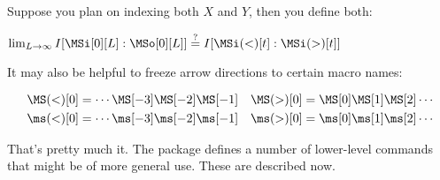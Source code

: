 \documentclass{article}
\begin{document}
Suppose you plan on indexing both $X$ and $Y$, then you define both:
\begin{LTXexample}[pos=b]
$\lim_{L \to \infty} I[ \MSi[0][L] : \MSo[0][L] ] \stackrel{?}{=} I[ \MSi(<)[t] : \MSi(>)[t]]$
\end{LTXexample}

It may also be helpful to freeze arrow directions to certain macro names:
\begin{LTXexample}[pos=b]
\newcommand{\Past}{\MS(<)}
\newcommand{\past}{\ms(<)}
\newcommand{\Future}{\MS(>)}
\newcommand{\future}{\ms(>)}
\begin{align*}
\Past[0] &= \cdots \MS[-3] \MS[-2] \MS[-1] &
\Future[0] &= \MS[0] \MS[1] \MS[2] \cdots \\
\past[0] &= \cdots \ms[-3] \ms[-2] \ms[-1] &
\future[0] &= \ms[0] \ms[1] \ms[2] \cdots \\
\end{align*}
\end{LTXexample}

That's pretty much it. The package defines a number of lower-level commands
that might be of more general use. These are described now.
\end{document}
